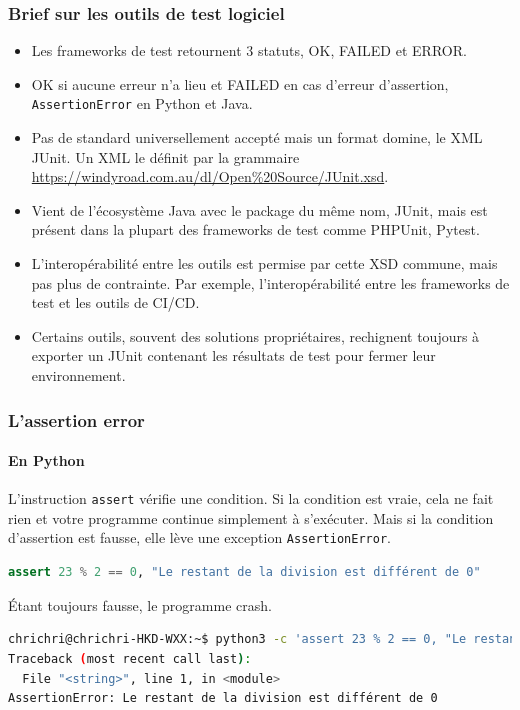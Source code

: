 \documentclass{beamer}
\begin{document}
    \begin{frame}
        \transdissolve
        \frametitle{Brief sur les outils de test logiciel}
        \begin{itemize}
            \item Les frameworks de test retournent 3 statuts, OK, FAILED et ERROR.

            \item OK si aucune erreur n’a lieu et FAILED en cas d’erreur d’assertion, \lstinline{AssertionError} en Python et Java.

            \item Pas de standard universellement accepté mais un format domine, le XML JUnit.
            Un XML le définit par la grammaire \url{https://windyroad.com.au/dl/Open\%20Source/JUnit.xsd}.

            \item Vient de l’écosystème Java avec le package du même nom, JUnit, mais est présent dans la plupart des frameworks de test comme PHPUnit, Pytest.

            \item L’interopérabilité entre les outils est permise par cette XSD commune, mais pas plus de contrainte.
            Par exemple, l’interopérabilité entre les frameworks de test et les outils de CI/CD.

            \item Certains outils, souvent des solutions propriétaires, rechignent toujours à exporter un JUnit contenant les résultats de test pour fermer leur environnement.

        \end{itemize}
    \end{frame}


    \begin{frame}[fragile]
        \frametitle{L'assertion error}
        \framesubtitle{En Python}
        \transdissolve
        L’instruction \lstinline{assert} vérifie une condition.
        Si la condition est vraie, cela ne fait rien et votre programme continue simplement à s’exécuter.
        Mais si la condition d’assertion est fausse, elle lève une exception \lstinline{AssertionError}.
        \begin{lstlisting}[language=Python]
assert 23 % 2 == 0, "Le restant de la division est différent de 0"
        \end{lstlisting}
        Étant toujours fausse, le programme crash.
        \begin{lstlisting}[language=sh]
chrichri@chrichri-HKD-WXX:~$ python3 -c 'assert 23 % 2 == 0, "Le restant de la division est différent de 0"'
Traceback (most recent call last):
  File "<string>", line 1, in <module>
AssertionError: Le restant de la division est différent de 0
        \end{lstlisting}
    \end{frame}
\end{document}
